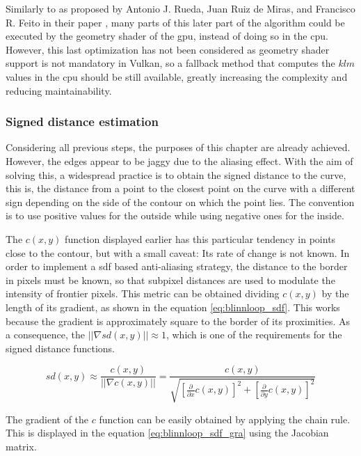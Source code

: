 \documentclass[\topdir/main.tex]{subfiles}
\begin{document}
Similarly to as proposed by Antonio J. Rueda, Juan Ruiz de Miras, and Francisco R. Feito in their paper \cite{ruedaruizfeito2008}, many parts of this later part of the algorithm could be executed by the geometry shader of the \gls{gpu}, instead of doing so in the \gls{cpu}. However, this last optimization has not been considered as geometry shader support is not mandatory in Vulkan, so a fallback method that computes the $klm$ values in the \gls{cpu} should be still available, greatly increasing the complexity and reducing maintainability.\newline 

\subsubsection{Signed distance estimation}
Considering all previous steps, the purposes of this chapter are already achieved. However, the edges appear to be jaggy due to the aliasing effect. With the aim of solving this, a widespread practice is to obtain the signed distance to the curve, this is, the distance from a point to the closest point on the curve with a different sign depending on the side of the contour on which the point lies. The convention is to use positive values for the outside while using negative ones for the inside.\newline

The $c(x, y)$ function displayed earlier has this particular tendency in points close to the contour, but with a small caveat: Its rate of change is not known. In order to implement a \gls{sdf} based anti-aliasing strategy, the distance to the border in pixels must be known, so that subpixel distances are used to modulate the intensity of frontier pixels. This metric can be obtained dividing $c(x, y)$ by the length of its gradient, as shown in the equation \eqref{eq:blinnloop_sdf}. This works because the gradient is approximately square to the border of its proximities. As a consequence, the $||\nabla sd(x, y)|| \approx 1$, which is one of the requirements for the signed distance functions.\newline

\begin{equation} \label{eq:blinnloop_sdf}
    sd(x, y) \approx \frac{c(x, y)}{||\nabla c(x, y)||} = \frac{c(x, y)}{\sqrt{[\frac{\partial}{\partial x} c(x, y)]^2 + [\frac{\partial}{\partial y} c(x, y)]^2}}
\end{equation}
        
The gradient of the $c$ function can be easily obtained by applying the chain rule. This is displayed in the equation \eqref{eq:blinnloop_sdf_gra} using the Jacobian matrix.
\end{document}
